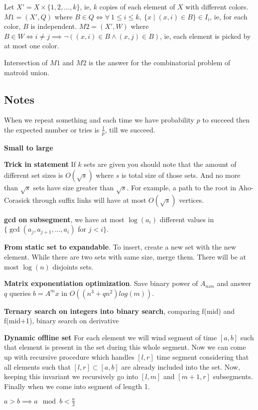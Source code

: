 \documentclass[a4paper,10pt,oneside]{article}
\begin{document}
\begin{multicols}{2}
Let $X' = X \times \{1, 2, \dots, k\}$, ie, $k$ copies of each element of $X$ with different colors. $M1 = (X', Q)$ where $B \in Q \iff \forall ~1 \le i \le k, ~\{x\mid (x, i) \in B\} \in I_i$, ie, for each color, $B$ is independent. $M2 = (X', W)$ where $B \in W \iff i \not= j \implies \lnot((x, i) \in B \land (x, j) \in B)$, ie, each element is picked by at most one color.

Intersection of $M1$ and $M2$ is the answer for the combinatorial problem of matroid union.

\subsection{Notes}
When we repeat something and each time we have probability $p$ to succeed then the expected number or tries is $\frac{1}{p}$, till we succeed.

\textbf{Small to large}

\textbf{Trick in statement} If $k$ sets are given you should note that the amount of different set sizes is $O(\sqrt{s})$ where $s$ is total size of those sets. And no more than $\sqrt{s}$ sets have size greater than $\sqrt{s}$. For example, a path to the root in Aho-Corasick through suffix links will have at most $O(\sqrt{s})$ vertices.

\textbf{gcd on subsegment}, we have at most $\log(a_i)$ different values in $\{\gcd(a_j, a_{j+1}, ..., a_i)$ for $j < i\}$.

\textbf{From static set to expandable}. To insert, create a new set with the new element. While there are two sets with same size, merge them. There will be at most $\log(n)$ disjoints sets.

\textbf{Matrix exponentiation optimization}. Save binary power of $A_{nxn}$ and answer $q$ queries $b = A^mx$ in $O((n^3 + qn^2)log(m))$.

\textbf{Ternary search on integers into binary search}, comparing f(mid) and f(mid+1), binary search on derivative

\textbf{Dynamic offline set} For each element we will wind segment of time $[a, b]$ such that element is present in the set during this whole segment. Now we can come up with recursive procedure which handles $[l, r]$ time segment considering that all elements such that $[l, r] \subset [a, b]$ are already included into the set. Now, keeping this invariant we recursively go into $[l, m]$ and $[m+1, r]$ subsegments. Finally when we come into segment of length 1.

$a > b \implies a \mod b < \frac{a}{2}$


\end{multicols}
\end{document}

